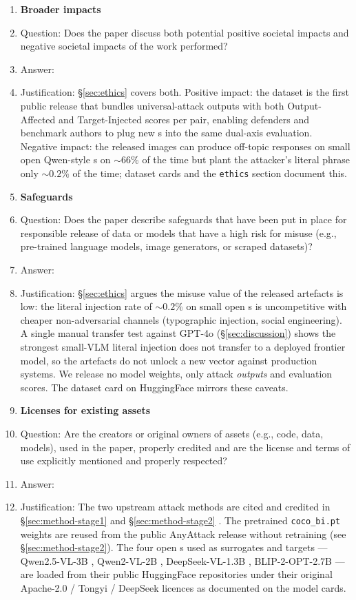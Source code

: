 \begin{enumerate}
\item {\bf Broader impacts}
    \item[] Question: Does the paper discuss both potential positive societal impacts and negative societal impacts of the work performed?
    \item[] Answer: \answerYes{}
    \item[] Justification: \S\ref{sec:ethics} covers both. Positive impact: the dataset is the first public release that bundles universal-attack outputs with both Output-Affected and Target-Injected scores per pair, enabling defenders and benchmark authors to plug new \vlm{}s into the same dual-axis evaluation. Negative impact: the released images can produce off-topic responses on small open Qwen-style \vlm{}s on $\sim\!66\%$ of the time but plant the attacker's literal phrase only $\sim\!0.2\%$ of the time; dataset cards and the \texttt{ethics} section document this.

\item {\bf Safeguards}
    \item[] Question: Does the paper describe safeguards that have been put in place for responsible release of data or models that have a high risk for misuse (e.g., pre-trained language models, image generators, or scraped datasets)?
    \item[] Answer: \answerYes{}
    \item[] Justification: \S\ref{sec:ethics} argues the misuse value of the released artefacts is low: the literal injection rate of $\sim 0.2\%$ on small open \vlm{}s is uncompetitive with cheaper non-adversarial channels (typographic injection, social engineering). A single manual transfer test against GPT-4o (\S\ref{sec:discussion}) shows the strongest small-VLM literal injection does not transfer to a deployed frontier model, so the artefacts do not unlock a new vector against production systems. We release no model weights, only attack \emph{outputs} and evaluation scores. The dataset card on HuggingFace mirrors these caveats.

\item {\bf Licenses for existing assets}
    \item[] Question: Are the creators or original owners of assets (e.g., code, data, models), used in the paper, properly credited and are the license and terms of use explicitly mentioned and properly respected?
    \item[] Answer: \answerYes{}
    \item[] Justification: The two upstream attack methods are cited and credited in \S\ref{sec:method-stage1} \citep{rahmatullaev2025universal} and \S\ref{sec:method-stage2} \citep{zhang2025anyattack}. The pretrained \texttt{coco\_bi.pt} weights are reused from the public AnyAttack release without retraining (see \S\ref{sec:method-stage2}). The four open \vlm{}s used as surrogates and targets --- Qwen2.5-VL-3B \citep{bai2025qwen25vl}, Qwen2-VL-2B \citep{wang2024qwen2vl}, DeepSeek-VL-1.3B \citep{lu2024deepseekvl}, BLIP-2-OPT-2.7B \citep{li2023blip2} --- are loaded from their public HuggingFace repositories under their original Apache-2.0 / Tongyi / DeepSeek licences as documented on the model cards.


\end{enumerate}
